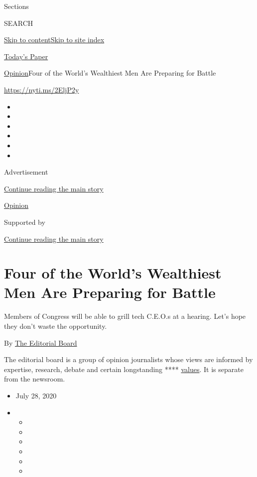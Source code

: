 Sections

SEARCH

\protect\hyperlink{site-content}{Skip to
content}\protect\hyperlink{site-index}{Skip to site index}

\href{https://myaccount.nytimes.com/auth/login?response_type=cookie\&client_id=vi}{}

\href{https://www.nytimes.com/section/todayspaper}{Today's Paper}

\href{/section/opinion}{Opinion}\textbar{}Four of the World's Wealthiest
Men Are Preparing for Battle

\url{https://nyti.ms/2EljP2y}

\begin{itemize}
\item
\item
\item
\item
\item
\item
\end{itemize}

Advertisement

\protect\hyperlink{after-top}{Continue reading the main story}

\href{/section/opinion}{Opinion}

Supported by

\protect\hyperlink{after-sponsor}{Continue reading the main story}

\hypertarget{four-of-the-worlds-wealthiest-men-are-preparing-for-battle}{%
\section{Four of the World's Wealthiest Men Are Preparing for
Battle}\label{four-of-the-worlds-wealthiest-men-are-preparing-for-battle}}

Members of Congress will be able to grill tech C.E.O.s at a hearing.
Let's hope they don't waste the opportunity.

By
\href{https://www.nytimes.com/interactive/opinion/editorialboard.html}{The
Editorial Board}

The editorial board is a group of opinion journalists whose views are
informed by expertise, research, debate and certain longstanding ****
\href{https://www.nytimes.com/interactive/2018/opinion/editorialboard.html}{values}.
It is separate from the newsroom.

\begin{itemize}
\item
  July 28, 2020
\item
  \begin{itemize}
  \item
  \item
  \item
  \item
  \item
  \item
  \end{itemize}
\end{itemize}

